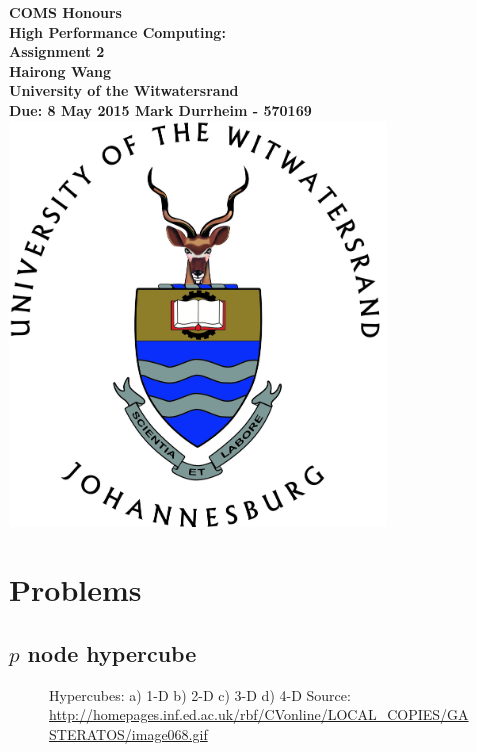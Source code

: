 \documentclass[11pt]{article}
\begin{document}
     



\begin{titlepage}
    \centering
    \vfill
    {\bfseries\Large
        COMS Honours \\
	High Performance Computing:\\
	 Assignment 2\\        
        Hairong Wang\\
	University of the Witwatersrand\\
           Due:  8 May 2015
        \vskip1cm
	Mark Durrheim - 570169\\     
    }    
    \vskip3cm
    \includegraphics[width=10cm]{wits.jpg} 

\end{titlepage}
\newpage

\tableofcontents
\newpage

\section{Problems}

\subsection{$p$ node hypercube}

\begin{figure}
\caption{Hypercubes: a) 1-D b) 2-D c) 3-D d) 4-D \newline Source: \protect\url{http://homepages.inf.ed.ac.uk/rbf/CVonline/LOCAL_COPIES/GASTERATOS/image068.gif}}
\end{figure}
\end{document}
